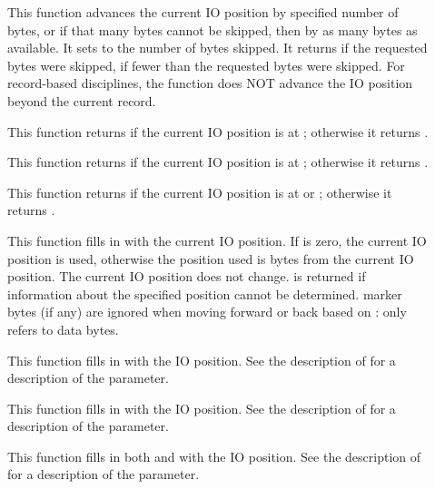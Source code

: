 \begin{description}
\item[\small{}]
This function advances the current IO position by specified number of bytes, or if that many
bytes cannot be skipped, then by as many bytes as available.
It sets  to the number of bytes skipped.
It returns  if the requested bytes were skipped,  if fewer
than the requested bytes were skipped.  For record-based 
disciplines, the function does NOT advance the IO position beyond the
current record.

\item[\small{}]
This function returns  if the current IO position is
at ; otherwise it returns .

\item[\small{}]
This function returns  if the current IO position is
at ; otherwise it returns .

\item[\small{}]
This function returns  if the current IO position is
at  or ; otherwise it returns .

\item[\small{}]
This function fills in  with the current IO position.
If  is zero, the current IO position is
used, otherwise the position used is  bytes from the
current IO position.  
The current IO position does not change.   is returned if
information about the specified position cannot be determined. 
 marker bytes (if any) are ignored when moving forward or back
based on :  only refers to data bytes.

\item[\small{}]
This function fills in  with the IO position.
See the description of  for a description of the
 parameter.

\item[\small{}]
This function fills in  with the IO position.
See the description of  for a description of the
 parameter.
 
\item[\small{}]
This function fills in both  and  with the IO
position. See the description of  for a description of the
 parameter.
\end{description}